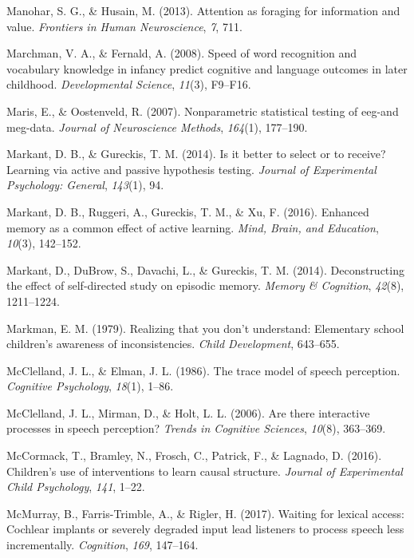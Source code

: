 \documentclass[oneside]{report}
\begin{document}
\hypertarget{ref-manohar2013attention}{}
Manohar, S. G., \& Husain, M. (2013). Attention as foraging for
information and value. \emph{Frontiers in Human Neuroscience}, \emph{7},
711.

\hypertarget{ref-marchman2008speed}{}
Marchman, V. A., \& Fernald, A. (2008). Speed of word recognition and
vocabulary knowledge in infancy predict cognitive and language outcomes
in later childhood. \emph{Developmental Science}, \emph{11}(3), F9--F16.

\hypertarget{ref-maris2007nonparametric}{}
Maris, E., \& Oostenveld, R. (2007). Nonparametric statistical testing
of eeg-and meg-data. \emph{Journal of Neuroscience Methods},
\emph{164}(1), 177--190.

\hypertarget{ref-markant2014better}{}
Markant, D. B., \& Gureckis, T. M. (2014). Is it better to select or to
receive? Learning via active and passive hypothesis testing.
\emph{Journal of Experimental Psychology: General}, \emph{143}(1), 94.

\hypertarget{ref-markant2016enhanced}{}
Markant, D. B., Ruggeri, A., Gureckis, T. M., \& Xu, F. (2016). Enhanced
memory as a common effect of active learning. \emph{Mind, Brain, and
Education}, \emph{10}(3), 142--152.

\hypertarget{ref-markant2014deconstructing}{}
Markant, D., DuBrow, S., Davachi, L., \& Gureckis, T. M. (2014).
Deconstructing the effect of self-directed study on episodic memory.
\emph{Memory \& Cognition}, \emph{42}(8), 1211--1224.

\hypertarget{ref-markman1979realizing}{}
Markman, E. M. (1979). Realizing that you don't understand: Elementary
school children's awareness of inconsistencies. \emph{Child
Development}, 643--655.

\hypertarget{ref-mcclelland1986trace}{}
McClelland, J. L., \& Elman, J. L. (1986). The trace model of speech
perception. \emph{Cognitive Psychology}, \emph{18}(1), 1--86.

\hypertarget{ref-mcclelland2006there}{}
McClelland, J. L., Mirman, D., \& Holt, L. L. (2006). Are there
interactive processes in speech perception? \emph{Trends in Cognitive
Sciences}, \emph{10}(8), 363--369.

\hypertarget{ref-mccormack2016children}{}
McCormack, T., Bramley, N., Frosch, C., Patrick, F., \& Lagnado, D.
(2016). Children's use of interventions to learn causal structure.
\emph{Journal of Experimental Child Psychology}, \emph{141}, 1--22.

\hypertarget{ref-mcmurray2017waiting}{}
McMurray, B., Farris-Trimble, A., \& Rigler, H. (2017). Waiting for
lexical access: Cochlear implants or severely degraded input lead
listeners to process speech less incrementally. \emph{Cognition},
\emph{169}, 147--164.
\end{document}
